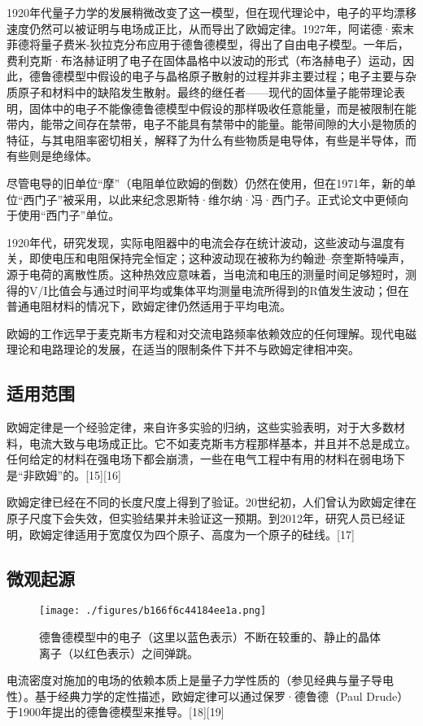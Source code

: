 1920年代量子力学的发展稍微改变了这一模型，但在现代理论中，电子的平均漂移速度仍然可以被证明与电场成正比，从而导出了欧姆定律。1927年，阿诺德·索末菲德将量子费米-狄拉克分布应用于德鲁德模型，得出了自由电子模型。一年后，费利克斯·布洛赫证明了电子在固体晶格中以波动的形式（布洛赫电子）运动，因此，德鲁德模型中假设的电子与晶格原子散射的过程并非主要过程；电子主要与杂质原子和材料中的缺陷发生散射。最终的继任者——现代的固体量子能带理论表明，固体中的电子不能像德鲁德模型中假设的那样吸收任意能量，而是被限制在能带内，能带之间存在禁带，电子不能具有禁带中的能量。能带间隙的大小是物质的特征，与其电阻率密切相关，解释了为什么有些物质是电导体，有些是半导体，而有些则是绝缘体。

尽管电导的旧单位“摩”（电阻单位欧姆的倒数）仍然在使用，但在1971年，新的单位“西门子”被采用，以此来纪念恩斯特·维尔纳·冯·西门子。正式论文中更倾向于使用“西门子”单位。

1920年代，研究发现，实际电阻器中的电流会存在统计波动，这些波动与温度有关，即使电压和电阻保持完全恒定；这种波动现在被称为约翰逊–奈奎斯特噪声，源于电荷的离散性质。这种热效应意味着，当电流和电压的测量时间足够短时，测得的V/I比值会与通过时间平均或集体平均测量电流所得到的R值发生波动；但在普通电阻材料的情况下，欧姆定律仍然适用于平均电流。

欧姆的工作远早于麦克斯韦方程和对交流电路频率依赖效应的任何理解。现代电磁理论和电路理论的发展，在适当的限制条件下并不与欧姆定律相冲突。
\subsection{适用范围} 
欧姆定律是一个经验定律，来自许多实验的归纳，这些实验表明，对于大多数材料，电流大致与电场成正比。它不如麦克斯韦方程那样基本，并且并不总是成立。任何给定的材料在强电场下都会崩溃，一些在电气工程中有用的材料在弱电场下是“非欧姆”的。[15][16]

欧姆定律已经在不同的长度尺度上得到了验证。20世纪初，人们曾认为欧姆定律在原子尺度下会失效，但实验结果并未验证这一预期。到2012年，研究人员已经证明，欧姆定律适用于宽度仅为四个原子、高度为一个原子的硅线。[17]
\subsection{微观起源}
\begin{figure}[ht]
\centering
\texttt{[image: ./figures/b166f6c44184ee1a.png]}
\caption{德鲁德模型中的电子（这里以蓝色表示）不断在较重的、静止的晶体离子（以红色表示）之间弹跳。} \label{fig_OuMu_5}
\end{figure}
电流密度对施加的电场的依赖本质上是量子力学性质的（参见经典与量子导电性）。基于经典力学的定性描述，欧姆定律可以通过保罗·德鲁德（Paul Drude）于1900年提出的德鲁德模型来推导。[18][19]

